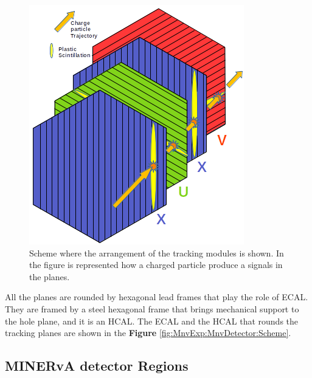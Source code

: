 \begin{figure}[!htb]
\centering
\includegraphics[scale=0.5]{Figures/Chapter2/TrackingModules.png}

        \caption{Scheme where the arrangement of the tracking modules is shown. In the figure is represented how a charged particle produce a signals in the planes.} 
\label{fig:MnvExp:MnvDetector:TrackingModules}
\end{figure}

All the planes are rounded by hexagonal lead frames that play the role of ECAL. They are framed by a steel hexagonal frame that brings mechanical support to the hole plane, and it is an HCAL. The ECAL and the HCAL that rounds the tracking planes are shown in the \textbf{Figure} \ref{fig:MnvExp:MnvDetector:Scheme}.

\subsection{MINERvA detector Regions}
\label{Cap:MnvExp:MnvDetector:MnvDetectorRegions} 

